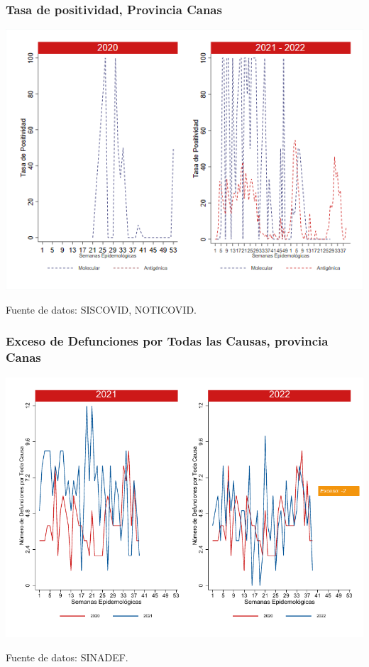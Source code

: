 \documentclass[xcolor=table]{beamer}
\begin{document}
\begin{frame}
	\frametitle{Tasa de positividad, Provincia Canas}
	\vspace{-.5cm}
	\begin{center}
		\includegraphics[width=0.8\linewidth, trim={0cm .5cm 0cm 0.2cm},clip]{../figuras/positividad_20_21_4.png}
	\end{center}
	{\tiny Fuente de datos: SISCOVID, NOTICOVID.}
\end{frame}

\begin{frame}
	\frametitle{Exceso de Defunciones por Todas las Causas, provincia Canas}
	\vspace{-.5cm}
	\begin{center}
		\includegraphics[width=0.8\linewidth, trim={0cm .5cm 0cm 0.2cm},clip]{../figuras/exceso_4.pdf}
	\end{center}
	{\tiny Fuente de datos: SINADEF.}
	
	\hyperlink{indicadores_provinciales}{}
\end{frame}
\end{document}
